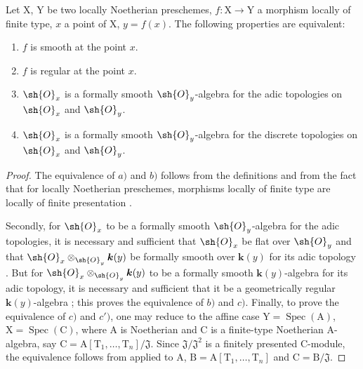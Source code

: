 \begin{theorem}[6.8.6]
\label{IV.6.8.6}
Let $\mathrm{X}$, $\mathrm{Y}$ be two locally Noetherian preschemes, $f:\mathrm{X}\to\mathrm{Y}$ a morphism locally of finite type, $x$ a point of $\mathrm{X}$, $y=f(x)$. The following properties are equivalent:
\begin{enumerate}[label=\emph{\alph*)}]
  \item $f$ is smooth at the point $x$.
  \item $f$ is regular at the point $x$.
  \item $\sh{O}_x$ is a formally smooth $\sh{O}_y$-algebra  for the adic topologies on $\sh{O}_x$ and $\sh{O}_y$.
  \item[\emph{c$'$)}] $\sh{O}_x$ is a formally smooth $\sh{O}_y$-algebra  for the discrete topologies on $\sh{O}_x$ and $\sh{O}_y$.
\end{enumerate}
\end{theorem}

\begin{proof}
The equivalence of $a)$ and $b)$ follows from the definitions  and from the fact that for locally Noetherian preschemes, morphisms locally of finite type are locally of finite presentation .

Secondly, for $\sh{O}_x$ to be a formally smooth $\sh{O}_y$-algebra for the adic topologies, it is necessary and sufficient that $\sh{O}_x$ be flat over $\sh{O}_y$ and that $\sh{O}_x\otimes_{\sh{O}_y}\boldsymbol{k}(y)$ be formally smooth over $\boldsymbol{k}(y)$ for its adic topology . But for $\sh{O}_x\otimes_{\sh{O}_y}\boldsymbol{k}(y)$ to be a formally smooth $\boldsymbol{k}(y)$-algebra for its adic topology, it is necessary and sufficient that it be a geometrically regular $\boldsymbol{k}(y)$-algebra ; this proves the equivalence of $b)$ and $c)$. Finally, to prove the equivalence of $c)$ and $c')$, one may reduce to the affine case $\mathrm{Y}=\operatorname{Spec}(\mathrm{A})$, $\mathrm{X}=\operatorname{Spec}(\mathrm{C})$, where $\mathrm{A}$ is Noetherian and $\mathrm{C}$ is a finite-type Noetherian $\mathrm{A}$-algebra, say $\mathrm{C}=\mathrm{A}[\mathrm{T}_1,\ldots,\mathrm{T}_n]/\mathfrak{J}$. Since $\mathfrak{J}/\mathfrak{J}^2$ is a finitely presented $\mathrm{C}$-module, the equivalence follows from  applied to $\mathrm{A}$, $\mathrm{B}=\mathrm{A}[\mathrm{T}_1,\ldots,\mathrm{T}_n]$ and $\mathrm{C}=\mathrm{B}/\mathfrak{J}$.
\end{proof}

